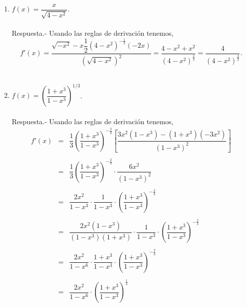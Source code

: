 \begin{enumerate}[\bfseries 1.]
    \item $f(x)=\dfrac{x}{\sqrt{4-x^2}}$.\\\\
	Respuesta.- Usando las reglas de derivación tenemos,
	$$f'(x)=\dfrac{\sqrt{-x^2}-x\dfrac{1}{2}\left(4-x^2\right)^{-\frac{1}{2}}(-2x)}{\left(\sqrt{4-x^2}\right)^2}=\dfrac{4-x^2+x^2}{\left(4-x^2\right)^{\frac{3}{2}}}=\dfrac{4}{\left(4-x^2\right)^{\frac{3}{2}}}.$$\\

    \item $f(x)=\left(\dfrac{1+x^3}{1-x^3}\right)^{1/3}$.\\\\
	Respuesta.- Usando las reglas de derivación tenemos,
	$$\begin{array}{rcl}
	    f'(x)&=&\dfrac{1}{3}\left(\dfrac{1+x^3}{1-x^3}\right)^{-\frac{2}{3}}\left[\dfrac{3x^2\left(1-x^3\right)-\left(1+x^3\right)\left(-3x^2\right)}{\left(1-x^3\right)^2}\right]\\\\
		 &=&\dfrac{1}{3}\left(\dfrac{1+x^3}{1-x^3}\right)^{-\frac{2}{3}}\cdot \dfrac{6x^2}{\left(1-x^3\right)^2}\\\\
		 &=&\dfrac{2x^2}{1-x^3}\cdot \dfrac{1}{1-x^3}\cdot \left(\dfrac{1+x^3}{1-x^3}\right)^{-\frac{2}{3}}\\\\
		 &=&\dfrac{2x^2\left(1-x^3\right)}{\left(1-x^3\right)\left(1+x^3\right)}\cdot \dfrac{1}{1-x^3}\cdot \left(\dfrac{1+x^3}{1-x^3}\right)^{-\frac{2}{3}}\\\\
		 &=&\dfrac{2x^2}{1-x^6}\cdot \dfrac{1+x^3}{1-x^3}\cdot \left(\dfrac{1+x^3}{1-x^3}\right)^{-\frac{2}{3}}\\\\
		 &=&\dfrac{2x^2}{1-x^6}\cdot \left(\dfrac{1+x^3}{1-x^3}\right)^{\frac{1}{3}}\\\\
	\end{array}$$
	\vspace{.7cm}


\end{enumerate}
